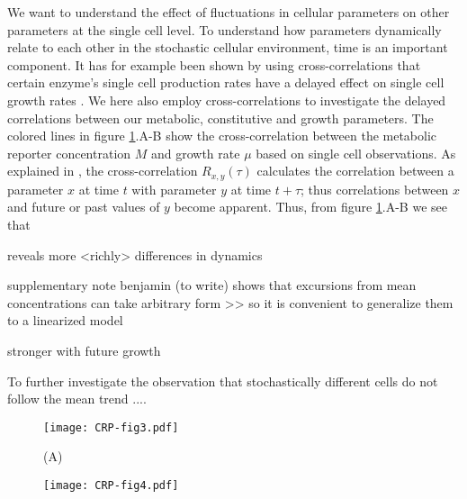 We want to understand the effect of fluctuations in cellular parameters on other parameters at the single cell level.
%
To understand how parameters dynamically relate to each other in the stochastic cellular environment, time is an important component.
%
It has for example been shown by using cross-correlations that certain enzyme's single cell production rates have a delayed effect on single cell growth rates \cite{Kiviet2014}.
%
We here also employ cross-correlations to investigate the delayed correlations between our metabolic, constitutive and growth parameters.
%
The colored lines in figure \ref{fig:CRP:fig3}.A-B show the cross-correlation between the metabolic reporter concentration $M$ and growth rate $\mu$ based on single cell observations.
%
As explained in , the cross-correlation $R_{x,y}(\tau)$ calculates the correlation between a parameter $x$ at time $t$ with parameter $y$ at time $t+\tau$; thus 
correlations between $x$ and future or past values of $y$ become apparent.
%
Thus, from figure \ref{fig:CRP:fig3}.A-B we see that 

reveals more <richly> differences in dynamics


supplementary note benjamin (to write) shows that excursions from mean concentrations can take arbitrary form
>> so it is convenient to generalize them to a linearized model




stronger with future growth

To further investigate the observation that stochastically different cells do not follow the mean trend ....








\begin{figure}
	\centering
	\texttt{[image: CRP-fig3.pdf]}
	\caption{ 
		(A) 
	}
	\label{fig:CRP:fig3}
\end{figure}

\begin{figure}
	\centering
	\texttt{[image: CRP-fig4.pdf]}
	\clearpage %
	\label{fig:CRP:fig4}
\end{figure}	

\clearpage


